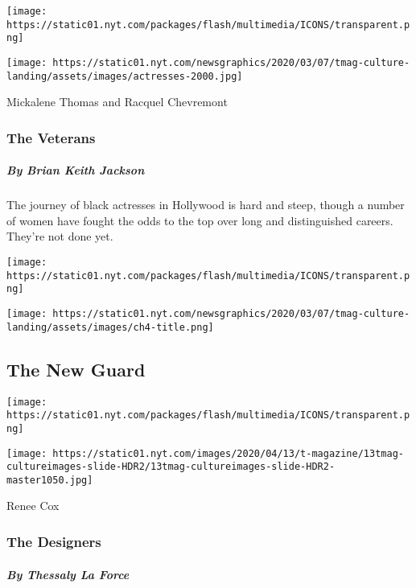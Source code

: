 \href{https://www.nytimes.com/interactive/2020/04/13/t-magazine/black-actresses-bassett-berry-blige-henson-whitfield-elise.html}{}

\texttt{[image: https://static01.nyt.com/packages/flash/multimedia/ICONS/transparent.png]}

\texttt{[image: https://static01.nyt.com/newsgraphics/2020/03/07/tmag-culture-landing/assets/images/actresses-2000.jpg]}

Mickalene Thomas and Racquel Chevremont

\hypertarget{the-veterans}{%
\subsubsection{The Veterans}\label{the-veterans}}

\hypertarget{by-brian-keith-jackson}{%
\subparagraph{By Brian Keith Jackson}\label{by-brian-keith-jackson}}

The journey of black actresses in Hollywood is hard and steep, though a
number of women have fought the odds to the top over long and
distinguished careers. They're not done yet.

\texttt{[image: https://static01.nyt.com/packages/flash/multimedia/ICONS/transparent.png]}

\texttt{[image: https://static01.nyt.com/newsgraphics/2020/03/07/tmag-culture-landing/assets/images/ch4-title.png]}

\hypertarget{the-new-guard}{%
\subsection{The New Guard}\label{the-new-guard}}

\href{https://www.nytimes.com/interactive/2020/04/13/t-magazine/asian-american-fashion-designers.html}{}

\texttt{[image: https://static01.nyt.com/packages/flash/multimedia/ICONS/transparent.png]}

\texttt{[image: https://static01.nyt.com/images/2020/04/13/t-magazine/13tmag-cultureimages-slide-HDR2/13tmag-cultureimages-slide-HDR2-master1050.jpg]}

Renee Cox

\hypertarget{the-designers}{%
\subsubsection{The Designers}\label{the-designers}}

\hypertarget{by-thessaly-la-force}{%
\subparagraph{By Thessaly La Force}\label{by-thessaly-la-force}}

